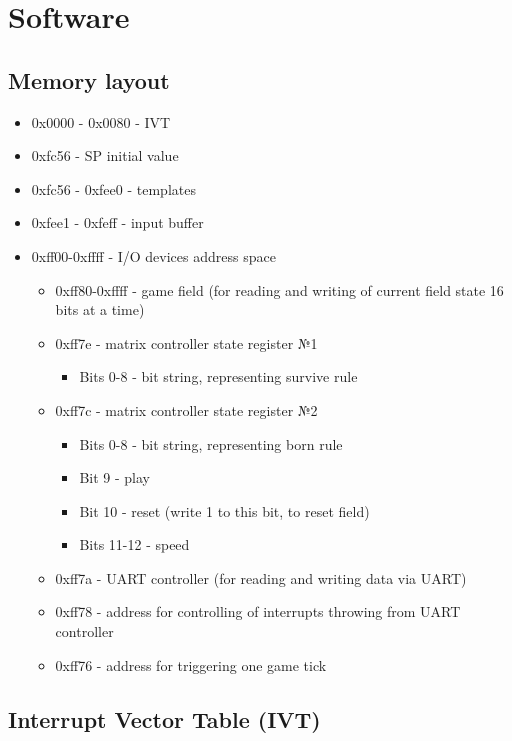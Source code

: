 \chapter*{Software}

\section*{Memory layout}

\begin{itemize}
	\item 0x0000 - 0x0080 - IVT
	\item 0xfc56 - SP initial value
	\item 0xfc56 - 0xfee0 - templates 
	\item 0xfee1 - 0xfeff - input buffer 
	\item 0xff00-0xffff - I/O devices address space \begin{itemize}
		\item 0xff80-0xffff - game field (for reading and writing of current field state 16 bits at a time) 
		\item 0xff7e - matrix controller state register №1 \begin{itemize}
				\item Bits 0-8 - bit string, representing survive rule
		\end{itemize}

		\item 0xff7c - matrix controller state register №2 \begin{itemize}
				\item Bits 0-8 - bit string, representing born rule
				\item Bit 9 - play
				\item Bit 10 - reset (write 1 to this bit, to reset field)
				\item Bits 11-12 - speed
		\end{itemize}
		\item 0xff7a - UART controller (for reading and writing data via UART) 
		\item 0xff78 - address for controlling of interrupts throwing from UART controller
		\item 0xff76 - address for triggering one game tick
	\end{itemize}
\end{itemize}

\section*{Interrupt Vector Table (IVT)}

